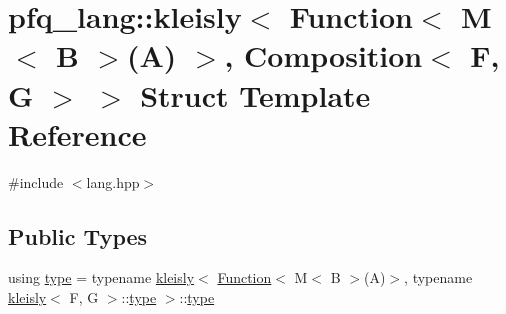 \hypertarget{structpfq__lang_1_1kleisly_3_01Function_3_01M_3_01B_01_4_07A_08_01_4_00_01Composition_3_01F_00_01G_01_4_01_4}{\section{pfq\+\_\+lang\+:\+:kleisly$<$ Function$<$ M$<$ B $>$(A) $>$, Composition$<$ F, G $>$ $>$ Struct Template Reference}
\label{structpfq__lang_1_1kleisly_3_01Function_3_01M_3_01B_01_4_07A_08_01_4_00_01Composition_3_01F_00_01G_01_4_01_4}
}


{\ttfamily \#include $<$lang.\+hpp$>$}

\subsection*{Public Types}
\begin{DoxyCompactItemize}
\item 
using \hyperlink{structpfq__lang_1_1kleisly_3_01Function_3_01M_3_01B_01_4_07A_08_01_4_00_01Composition_3_01F_00_01G_01_4_01_4_a73a71a99f99e69b49591eaab1f358e18}{type} = typename \hyperlink{structpfq__lang_1_1kleisly}{kleisly}$<$ \hyperlink{structpfq__lang_1_1Function}{Function}$<$ M$<$ B $>$(A)$>$, typename \hyperlink{structpfq__lang_1_1kleisly}{kleisly}$<$ F, G $>$\+::\hyperlink{structpfq__lang_1_1kleisly_3_01Function_3_01M_3_01B_01_4_07A_08_01_4_00_01Composition_3_01F_00_01G_01_4_01_4_a73a71a99f99e69b49591eaab1f358e18}{type} $>$\+::\hyperlink{structpfq__lang_1_1kleisly_3_01Function_3_01M_3_01B_01_4_07A_08_01_4_00_01Composition_3_01F_00_01G_01_4_01_4_a73a71a99f99e69b49591eaab1f358e18}{type}
\end{DoxyCompactItemize}


